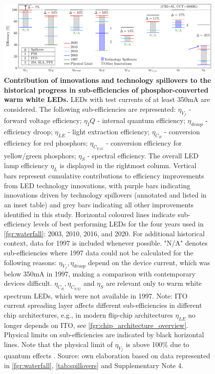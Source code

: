 \documentclass[parskip=full]{article}
\begin{document}
\begin{figure}[H]
 \centering
 \includegraphics[width=\textwidth]{figures/breakthroughs_efficiency.pdf}
 \caption{\textbf{Contribution of innovations and technology spillovers to the historical progress in sub-efficiencies of phosphor-converted warm white LEDs.} LEDs with test currents of at least 350mA are considered. The following sub-efficiencies are represented: $\eta_{V_f}$ - forward voltage efficiency; $\eta_IQ$ - internal quantum efficiency; $\eta_{droop}$ - efficiency droop; $\eta_{LE}$ - light extraction efficiency; $\eta_{C_R}$ - conversion efficiency for red phosphors; $\eta_{C_{Y/G}}$ - conversion efficiency for yellow/green phosphors; $\eta_S$ - spectral efficiency. The overall LED lamp efficiency $\eta_L$ is displayed in the rightmost column. Vertical bars represent cumulative contributions to efficiency improvements from LED technology innovations, with purple bars indicating innovations driven by technology spillovers (annotated and listed in an inset table) and grey bars indicating all other improvements identified in this study. Horizontal coloured lines indicate sub-efficiency levels of best performing LEDs for the four years used in \cref{fgr:waterfall}: 2003, 2010, 2016, and 2020. For additional historical context, data for 1997 is included whenever possible. "N/A" denotes sub-efficiencies where 1997 data could not be calculated for the following reasons: $\eta_{V_f}, \eta_{droop}$ depend on the device current, which was below 350mA in 1997, making a comparison with contemporary devices difficult. $\eta_{C_R}, \eta_{C_{Y/G}}$ and $\eta_S$ are relevant only to warm white spectrum LEDs, which were not available in 1997. Note: ITO current spreading layer affects different sub-efficiencies in different chip architectures, e.g., in modern flip-chip architectures $\eta_{LE}$ no longer depends on ITO, see \cref{fgr:chip_architecture_overview}. Physical limits on sub-efficiencies are indicated by black horizontal lines. Note that the physical limit of $\eta_{V_f}$ is above 100\% due to quantum effects \cite{david2016electrical}. Source: own elaboration based on data represented in \cref{fgr:waterfall}, \cref{tab:spillovers} and Supplementary Note 4.}
 \label{fgr:breakthroughs_efficiency}
\end{figure}
\end{document}
